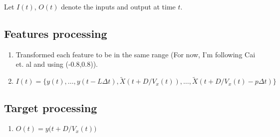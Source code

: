 \documentclass{article}
\begin{document}

\newpage

Let $I(t)$, $O(t)$ denote the inputs and output at time $t$.

\subsection{Features processing}

\begin{enumerate}
    \item Transformed each feature to be in the same range (For now, I'm
    following Cai et. al and using (-0.8,0.8)).
    \item $I(t) = \{y(t),\dots,y(t - L \Delta t), \tilde{X}(t + D /
    V_x(t)),\dots, \tilde{X}(t + D / V_x(t) - p \Delta t) \}$
\end{enumerate}

\subsection{Target processing}

\begin{enumerate}
    \item $O(t) = y \big(t + D / V_x(t) \big)$ 
\end{enumerate}
\end{document}
